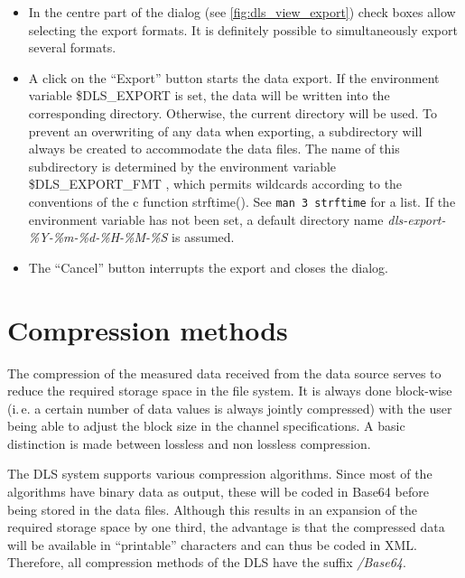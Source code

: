 \documentclass[a4paper,12pt,BCOR6mm,bibtotoc,idxtotoc]{scrbook}
\begin{document}
\begin{itemize}

\item In the centre part of the dialog (see \autoref{fig:dls_view_export})
check boxes allow selecting the export formats. It is definitely possible to
simultaneously export several formats.

\item A click on the ``Export'' button starts the data export. If the
environment variable \$DLS\_EXPORT is set, the data will
be written into the corresponding directory. Otherwise, the current directory
will be used. To prevent an overwriting of any data when exporting, a
subdirectory will always be created to accommodate the data files. The name of
this subdirectory is determined by the environment variable
\$DLS\_EXPORT\_FMT , which permits wildcards
according to the conventions of the c function strftime(). See \texttt{man 3
strftime} for a list. If the environment variable has not been set, a default
directory name \textit{dls-export-\%Y-\%m-\%d-\%H-\%M-\%S} is assumed.

\item The ``Cancel'' button interrupts the export and closes the dialog.

\end{itemize}


\chapter{Compression methods} \label{sec:comp} 

The compression of the measured data received from the data source serves to
reduce the required storage space in the file system. It is always done
block-wise (i.\,e. a certain number of data values is always jointly
compressed) with the user being able to adjust the block size in the channel
specifications. A basic distinction is made between lossless and
non lossless compression.

The DLS system supports various compression algorithms. Since most of the algorithms have binary data as output, these will be coded in Base64 before being stored in the data files. Although this results in an expansion of the required storage space by one third, the advantage is that the compressed data will be available in ``printable'' characters and can thus be coded in XML. Therefore, all compression methods of the DLS have the suffix \textit{/Base64}.
\end{document}
